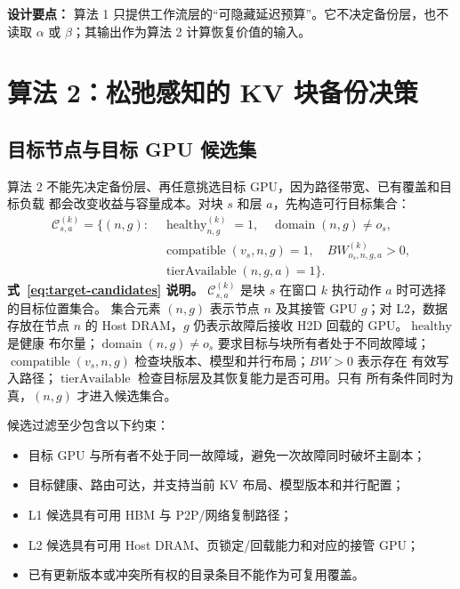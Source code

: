 \documentclass[UTF8,11pt,a4paper,fontset=fandol]{ctexart}
\newenvironment{designpoint}
  {\par\smallskip\noindent\textcolor{AegisBlue}{\textbf{设计要点：}}\ignorespaces}
  {\par\smallskip}
\begin{document}
\begin{designpoint}
算法 1 只提供工作流层的“可隐藏延迟预算”。它不决定备份层，也不读取
$\alpha$ 或 $\beta$；其输出作为算法 2 计算恢复价值的输入。
\end{designpoint}

\section{算法 2：松弛感知的 KV 块备份决策}

\subsection{目标节点与目标 GPU 候选集}

算法 2 不能先决定备份层、再任意挑选目标 GPU，因为路径带宽、已有覆盖和目标负载
都会改变收益与容量成本。对块 $s$ 和层 $a$，先构造可行目标集合：
\begin{equation}
  \begin{aligned}
    \mathcal C_{s,a}^{(k)}
    =\{(n,g):\;&
      \operatorname{healthy}_{n,g}^{(k)}=1,\quad
      \operatorname{domain}(n,g)\neq o_s,\\
    &\operatorname{compatible}(v_s,n,g)=1,\quad
      BW_{o_s,n,g,a}^{(k)}>0,\\
    &\operatorname{tierAvailable}(n,g,a)=1\}.
  \end{aligned}
  \label{eq:target-candidates}
\end{equation}
\noindent\textbf{式~\eqref{eq:target-candidates} 说明。}
$\mathcal C_{s,a}^{(k)}$ 是块 $s$ 在窗口 $k$ 执行动作 $a$ 时可选择的目标位置集合。
集合元素 $(n,g)$ 表示节点 $n$ 及其接管 GPU $g$；对 L2，数据存放在节点 $n$ 的
Host DRAM，$g$ 仍表示故障后接收 H2D 回载的 GPU。$\operatorname{healthy}$ 是健康
布尔量；$\operatorname{domain}(n,g)\neq o_s$ 要求目标与块所有者处于不同故障域；
$\operatorname{compatible}(v_s,n,g)$ 检查块版本、模型和并行布局；$BW>0$ 表示存在
有效写入路径；$\operatorname{tierAvailable}$ 检查目标层及其恢复能力是否可用。只有
所有条件同时为真，$(n,g)$ 才进入候选集合。

候选过滤至少包含以下约束：

\begin{itemize}
  \item 目标 GPU 与所有者不处于同一故障域，避免一次故障同时破坏主副本；
  \item 目标健康、路由可达，并支持当前 KV 布局、模型版本和并行配置；
  \item L1 候选具有可用 HBM 与 P2P/网络复制路径；
  \item L2 候选具有可用 Host DRAM、页锁定/回载能力和对应的接管 GPU；
  \item 已有更新版本或冲突所有权的目录条目不能作为可复用覆盖。
\end{itemize}
\end{document}
